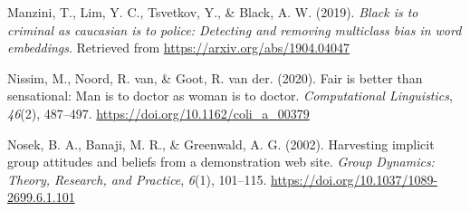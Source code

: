 \documentclass[
  10pt,
  dvipsnames,enabledeprecatedfontcommands, twocolumn]{scrartcl}
\newlength{\cslhangindent}
\newlength{\cslentryspacingunit} %
\newenvironment{CSLReferences}[2] %
 {%
  \setlength{\parindent}{0pt}
  \ifodd #1
  \let\oldpar\par
  \def\par{\hangindent=\cslhangindent\oldpar}
  \fi
  \setlength{\parskip}{#2\cslentryspacingunit}
 }%
 {}
\begin{document}
\begin{CSLReferences}{1}{0}
\leavevmode{}%
Manzini, T., Lim, Y. C., Tsvetkov, Y., \& Black, A. W. (2019).
\emph{Black is to criminal as caucasian is to police: Detecting and
removing multiclass bias in word embeddings}. Retrieved from
\url{https://arxiv.org/abs/1904.04047}

\leavevmode{}%
Nissim, M., Noord, R. van, \& Goot, R. van der. (2020). Fair is better
than sensational: Man is to doctor as woman is to doctor.
\emph{Computational Linguistics}, \emph{46}(2), 487--497.
\url{https://doi.org/10.1162/coli_a_00379}

\leavevmode{}%
Nosek, B. A., Banaji, M. R., \& Greenwald, A. G. (2002). Harvesting
implicit group attitudes and beliefs from a demonstration web site.
\emph{Group Dynamics: Theory, Research, and Practice}, \emph{6}(1),
101--115. \url{https://doi.org/10.1037/1089-2699.6.1.101}

\end{CSLReferences}
\end{document}
